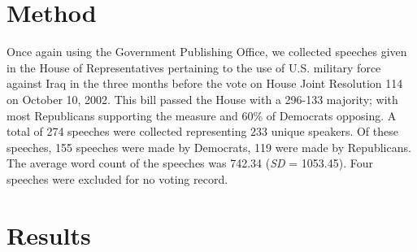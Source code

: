 \documentclass[english,,man]{apa6}
\theoremstyle{definition}
\theoremstyle{definition}
\theoremstyle{definition}
\theoremstyle{remark}
\begin{document}
\hypertarget{method-3}{%
\section{Method}\label{method-3}}

Once again using the Government Publishing Office, we collected speeches
given in the House of Representatives pertaining to the use of U.S.
military force against Iraq in the three months before the vote on House
Joint Resolution 114 on October 10, 2002. This bill passed the House
with a 296-133 majority; with most Republicans supporting the measure
and 60\% of Democrats opposing. A total of 274 speeches were collected
representing 233 unique speakers. Of these speeches, 155 speeches were
made by Democrats, 119 were made by Republicans. The average word count
of the speeches was 742.34 (\emph{SD} = 1053.45). Four speeches were
excluded for no voting record.

\hypertarget{results-2}{%
\section{Results}\label{results-2}}
\end{document}

